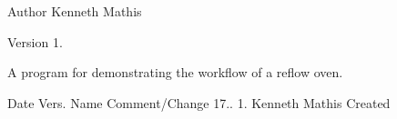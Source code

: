 \begin{DoxyAuthor}{Author}
Kenneth Mathis 
\end{DoxyAuthor}
\begin{DoxyVersion}{Version}
1.
\end{DoxyVersion}
A program for demonstrating the workflow of a reflow oven.

\DoxyHorRuler
 Date Vers. Name Comment/\+Change 17.. 1. Kenneth Mathis Created 